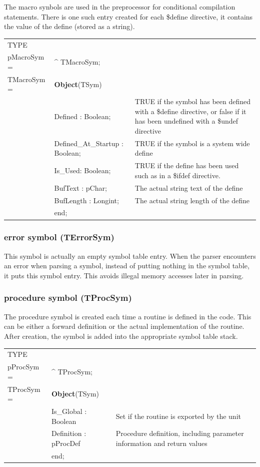 \documentclass [a4paper,12pt]{article}
\begin{document}
The macro synbols are used in the preprocessor for conditional compilation
statements. There is one such entry created for each {\$}define directive,
it contains the value of the define (stored as a string).

\begin{tabular*}{6.5in}{|l@{\extracolsep{\fill}}lp{6cm}|}
\hline
\textsf{TYPE}& & \\
\xspace pMacroSym = & \^{}  TMacroSym; & \\
\xspace \textsf{TMacroSym} = & \textbf{Object}(TSym) & \\
& \textsf{Defined : Boolean;}&
	TRUE if the symbol has been defined with a \textsf{{\$}define}
	directive, or false if it has been undefined with a
	\textsf{{\$}undef} directive \\
& \textsf{Defined{\_}At{\_}Startup : Boolean;}&
	TRUE if the symbol is a system wide define \\
& \textsf{Is{\_}Used: Boolean;}&
	TRUE if the define has been used such as in a \textsf{{\$}ifdef}
	directive. \\
& \textsf{BufText : pChar;}&
	The actual string text of the define \\
& \textsf{BufLength : Longint;}&
	The actual string length of the define \\
& \textsf{end;}&  \\
\hline
\end{tabular*}

\subsubsection{error symbol (TErrorSym)}
\label{subsubsec:error}

This symbol is actually an empty symbol table entry. When the parser
encounters an error when parsing a symbol, instead of putting nothing in the
symbol table, it puts this symbol entry. This avoids illegal memory accesses
later in parsing.

\subsubsection{procedure symbol (TProcSym)}
\label{subsubsec:procedure}

The procedure symbol is created each time a routine is defined in the code.
This can be either a forward definition or the actual implementation of the
routine. After creation, the symbol is added into the appropriate symbol
table stack.

\begin{tabular*}{6.5in}{|l@{\extracolsep{\fill}}lp{8cm}|}
\hline
\textsf{TYPE}& & \\
\xspace pProcSym = & \^{}  TProcSym; & \\
\xspace \textsf{TProcSym} = & \textbf{Object}(TSym) & \\
& \textsf{Is{\_}Global : Boolean}&
	Set if the routine is exported by the unit \\
& \textsf{Definition : pProcDef}&
	Procedure definition, including parameter information and return
	values \\
& \textsf{end;}&  \\
\hline
\end{tabular*}
\end{document}

